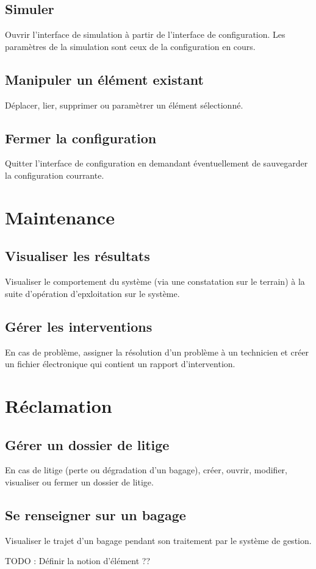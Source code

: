 \subsection{Simuler}
Ouvrir l'interface de simulation à partir de l'interface de configuration. Les paramètres de la simulation sont ceux de la configuration en cours.

\subsection{Manipuler un élément existant}
Déplacer, lier, supprimer ou paramètrer un élément sélectionné.

\subsection{Fermer la configuration}
Quitter l'interface de configuration en demandant éventuellement de sauvegarder la configuration courrante.

\section{Maintenance}
\subsection{Visualiser les résultats}
Visualiser le comportement du système (via une constatation sur le terrain) à la suite d'opération d'epxloitation sur le système.

\subsection{Gérer les interventions}
En cas de problème, assigner la résolution d'un problème à un technicien et créer un fichier électronique qui contient un rapport d'intervention.

\section{Réclamation}
\subsection{Gérer un dossier de litige}
En cas de litige (perte ou dégradation d'un bagage), créer, ouvrir, modifier, visualiser ou fermer un dossier de litige.

\subsection{Se renseigner sur un bagage}
Visualiser le trajet d'un bagage pendant son traitement par le système de gestion.

TODO : Définir la notion d'élément ??


